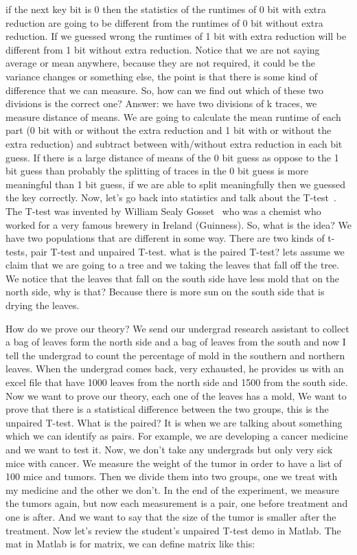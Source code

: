 if the next key bit is 0 then the statistics of the runtimes of 0 bit with extra
reduction are going to be different from the runtimes of 0 bit without extra
reduction. If we guessed wrong the runtimes of 1 bit with extra reduction will
be different from 1 bit without extra reduction. Notice that we are not saying
average or mean anywhere, because they are not required, it could be the
variance changes or something else, the point is that there is some kind of
difference that we can measure. So, how can we find out which of these two
divisions is the correct one? Answer: we have two divisions of k traces, we
measure distance of means. We are going to calculate the mean runtime of each
part (0 bit with or without the extra reduction and 1 bit with or without the
extra reduction) and subtract between with/without extra reduction in each bit
guess. If there is a large distance of means of the 0 bit guess as oppose to the
1 bit guess than probably the splitting of traces in the 0 bit guess is more
meaningful than 1 bit guess, if we are able to split meaningfully then we
guessed the key correctly. Now, let's go back into statistics and talk about the
T-test~\cite{wikittest}. The T-test was invented by William Sealy
Gosset~\cite{wikigosset} who was a chemist who worked for a very famous brewery
in Ireland (Guinness). So, what is the idea? We have two populations that are
different in some way. There are two kinds of t-tests, pair T-test and unpaired
T-test. what is the paired T-test? lets assume we claim that we are going to a
tree and we taking the leaves that fall off the tree. We notice that the leaves
that fall on the south side have less mold that on the north side, why is that?
Because there is more sun on the south side that is drying the leaves. 

How do we prove our theory? We send our undergrad research assistant to collect
a bag of leaves form the north side and a bag of leaves from the south and now I
tell the undergrad to count the percentage of mold in the southern and northern
leaves. When the undergrad comes back, very exhausted, he provides us with an
excel file that have 1000 leaves from the north side and 1500 from the south
side. Now we want to prove our theory, each one of the leaves has a mold, We
want to prove that there is a statistical difference between the two groups,
this is the unpaired T-test. What is the paired? It is when we are talking about
something which we can identify as pairs. For example, we are developing a
cancer medicine and we want to test it. Now, we don't take any undergrads but
only very sick mice with cancer. We measure the weight of the tumor in order to
have a list of 100 mice and tumors. Then we divide them into two groups, one we
treat with my medicine and the other we don't. In the end of the experiment, we
measure the tumors again, but now each measurement is a pair, one before
treatment and one is after. And we want to say that the size of the tumor is
smaller after the treatment. Now let's review the student's unpaired T-test demo
in Matlab. The mat in Matlab is for matrix, we can define matrix like this:

